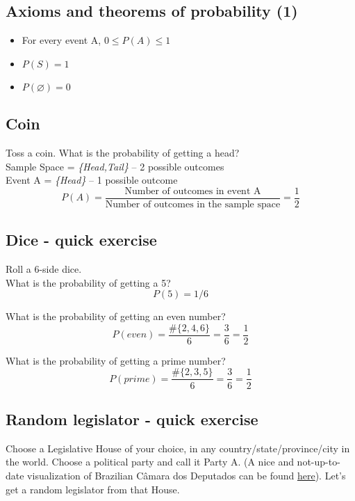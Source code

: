\documentclass[11pt]{article}
\let\emptyset\varnothing
\begin{document}
	\subsection*{Axioms and theorems of probability (1)}
	\begin{itemize}
		\item For every event A, $0 \leq P(A) \leq 1$
		\item $P(S) = 1$
		\item $P(\emptyset) = 0$
	\end{itemize}


	\subsection*{Coin}
	Toss a coin. What is the probability of getting a head?\\
	
	Sample Space = \emph{\{Head,Tail\}} -- 2 possible outcomes\\
	
	Event A = \emph{\{Head\}} -- 1 possible outcome\\
	
	\[P(A) = \frac{\text{Number of outcomes in event A}}
	{\text{Number of outcomes in the sample space}} = \frac{1}{2}\]


	\subsection*{Dice - quick exercise}

	Roll a 6-side dice.\\
	
	What is the probability of getting a 5?\\
	\[P(5) = 1/6	\]
	
	What is the probability of getting an even number?\\
	\[P(even) = \frac{\#\{2, 4, 6\}}{6} = \frac{3}{6} = \frac{1}{2}	\]
		
	What is the probability of getting a prime number?\\
	\[P(prime) = \frac{\#\{2, 3, 5\}}{6} = \frac{3}{6} = \frac{1}{2}	\]

	\subsection*{Random legislator - quick exercise}

	Choose a Legislative House of your choice, in any country/state/province/city in the world. Choose a political party and call it Party A. (A nice and not-up-to-date visualization of Brazilian Câmara dos Deputados can be found \href{http://g1.globo.com/politica/eleicoes/2014/nova-composicao-da-camara.html}{here}). Let's get a random legislator from that House.\\
	
\end{document}
